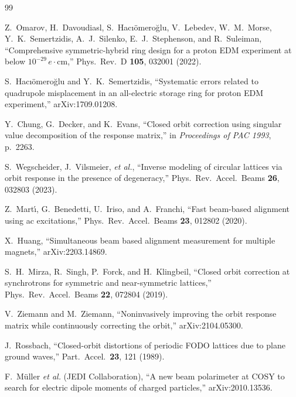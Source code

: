\documentclass[aps,prab,reprint,superscriptaddress,nofootinbib]{revtex4-2}
\begin{document}
\begin{thebibliography}{99}

Z.~Omarov, H.~Davoudiasl, S.~Hac{\i}\"omero\u{g}lu, V.~Lebedev,
W.~M.~Morse, Y.~K.~Semertzidis, A.~J.~Silenko, E.~J.~Stephenson, and
R.~Suleiman,
``Comprehensive symmetric-hybrid ring design for a proton EDM experiment at
below $10^{-29}\,e\!\cdot\!$cm,''
Phys.\ Rev.\ D \textbf{105}, 032001 (2022).

S.~Hac{\i}\"omero\u{g}lu and Y.~K.~Semertzidis,
``Systematic errors related to quadrupole misplacement in an all-electric
storage ring for proton EDM experiment,''
arXiv:1709.01208.

Y.~Chung, G.~Decker, and K.~Evans,
``Closed orbit correction using singular value decomposition of the response
matrix,''
in \emph{Proceedings of PAC 1993}, p.~2263.

S.~Wegscheider, J.~Vilsmeier, \emph{et al.},
``Inverse modeling of circular lattices via orbit response in the presence
of degeneracy,''
Phys.\ Rev.\ Accel.\ Beams \textbf{26}, 032803 (2023).

Z.~Mart\'{\i}, G.~Benedetti, U.~Iriso, and A.~Franchi,
``Fast beam-based alignment using ac excitations,''
Phys.\ Rev.\ Accel.\ Beams \textbf{23}, 012802 (2020).

X.~Huang,
``Simultaneous beam based alignment measurement for multiple magnets,''
arXiv:2203.14869.

S.~H.~Mirza, R.~Singh, P.~Forck, and H.~Klingbeil,
``Closed orbit correction at synchrotrons for symmetric and near-symmetric
lattices,''
Phys.\ Rev.\ Accel.\ Beams \textbf{22}, 072804 (2019).

V.~Ziemann and M.~Ziemann,
``Noninvasively improving the orbit response matrix while continuously
correcting the orbit,''
arXiv:2104.05300.

J.~Rossbach,
``Closed-orbit distortions of periodic FODO lattices due to plane ground
waves,''
Part.\ Accel.\ \textbf{23}, 121 (1989).

F.~M\"uller \emph{et al.} (JEDI Collaboration),
``A new beam polarimeter at COSY to search for electric dipole moments of
charged particles,''
arXiv:2010.13536.

\end{thebibliography}
\end{document}
